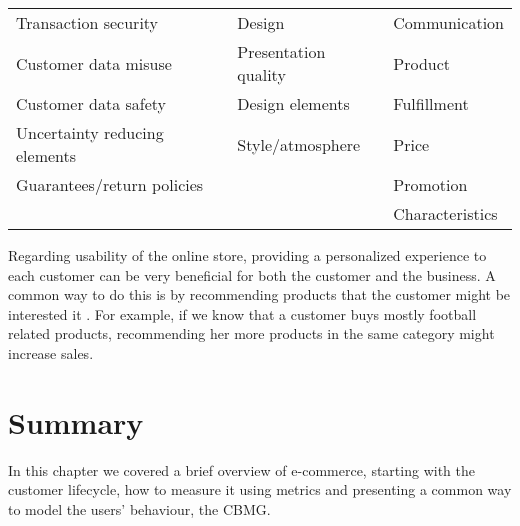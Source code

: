\begin{table}[h]
\begin{tabular}{lll}
    Transaction security                                 & 
    Design                                      & 
    Communication                               \\
    Customer data misuse                                 & Presentation 
    quality                        & 
    Product                                     \\
    Customer data safety                                 & Design 
    elements                             & 
    Fulfillment                                 \\
    Uncertainty reducing elements                        & 
    Style/atmosphere                            & 
    Price                                       \\
    Guarantees/return policies                           
    &                                             & 
    Promotion                                   \\
    &                                             & 
    Characteristics                            
\end{tabular}
\end{table}

Regarding usability of the online store, providing a personalized experience to 
each customer can be very beneficial for both the customer and the business. A 
common way to do this is by recommending products that the customer might be 
interested it \cite{Adomavicius2005}. For example, if we know that a customer 
buys mostly football related products, recommending her more products in the 
same category might increase sales.

\section{Summary}

In this chapter we covered a brief overview of e-commerce, starting with the 
customer lifecycle, how to measure it using metrics and presenting a common way 
to model the users' behaviour, the CBMG.
